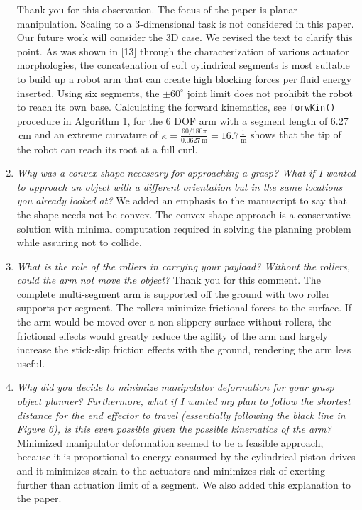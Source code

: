 \documentclass[letterpaper, 10 pt, twocolumn, conference]{article}
\newcommand{\unit}[1]{\ensuremath{\, \mathrm{#1}}} %
\begin{document}
\begin{enumerate}
%
Thank you for this observation. The focus of the paper is planar manipulation. Scaling to a 3-dimensional task is not considered in this paper. Our future work will consider the 3D case.
We revised the text to clarify this point. As was shown in [13] through the characterization of various actuator morphologies, the concatenation of soft cylindrical segments is most suitable to build up a robot arm that can create high blocking forces per fluid energy inserted. Using six segments, the $\pm 60^\circ$ joint limit does not prohibit the robot to reach its own base. Calculating the forward kinematics, see \texttt{forwKin()} procedure in Algorithm 1, for the 6 DOF arm with a segment length of 6.27\unit{cm} and an extreme curvature of $\kappa = \frac{60/180 \pi}{0.0627\unit{m}} = 16.7\frac{1}{\unit{m}}$ shows that the tip of the robot can reach its root at a full curl. 
%
\item \textit{Why was a convex shape necessary for approaching a grasp? What if I wanted to approach an object with a different orientation but in the same locations you already looked at?}
%
We added an emphasis to the manuscript to say that the shape needs not be convex. The convex shape approach is a conservative solution with minimal computation required in solving the planning problem while assuring not to collide. 
%
\item \textit{What is the role of the rollers in carrying your payload? Without the rollers, could the arm not move the object?}
%
Thank you for this comment. The complete multi-segment arm is supported off the ground with two roller supports per segment. 
The rollers minimize frictional forces to the surface. 
If the arm would be moved over a non-slippery surface without rollers, the frictional effects would greatly reduce the agility of the arm and largely increase the stick-slip friction effects with the ground, rendering the arm less useful.
%
\item \textit{Why did you decide to minimize manipulator deformation for your grasp object planner? Furthermore, what if I wanted my plan to follow the shortest distance for the end effector to travel (essentially following the black line in Figure 6), is this even possible given the possible kinematics of the arm?}
%
Minimized manipulator deformation seemed to be a feasible approach, because it is proportional to energy consumed by the cylindrical piston drives and it minimizes strain to the actuators and minimizes risk of exerting further than actuation limit of a segment. We also added this explanation to the paper. 
%
\end{enumerate}
%
\end{document}
